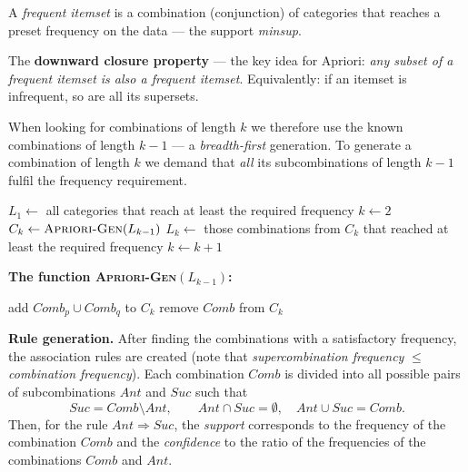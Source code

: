 \documentclass[11pt,a4paper]{article}
\theoremstyle{definition}
\begin{document}
\begin{defbox}
A \emph{frequent itemset} is a combination (conjunction) of categories that reaches a preset
frequency on the data --- the support \emph{minsup}.

The \textbf{downward closure property} --- the key idea for Apriori: \emph{any subset of a
frequent itemset is also a frequent itemset}. Equivalently: if an itemset is infrequent, so are
all its supersets.

When looking for combinations of length $k$ we therefore use the known combinations of length
$k-1$ --- a \emph{breadth-first} generation. To generate a combination of length $k$ we demand
that \emph{all} its subcombinations of length $k-1$ fulfil the frequency requirement.
\end{defbox}

\begin{defbox}
\begin{algorithmic}[1]
\State $L_1\gets$ all categories that reach at least the required frequency
\State $k\gets 2$
  \State $C_k\gets \textsc{Apriori-Gen}(L_{k-1})$ 
  \State $L_k\gets$ those combinations from $C_k$ that reached at least the required frequency
  \State $k\gets k+1$
\EndWhile
\end{algorithmic}

\textbf{The function \textsc{Apriori-Gen}$(L_{k-1})$:}
\begin{algorithmic}[1]
     \State add $\mathit{Comb}_p\cup \mathit{Comb}_q$ to $C_k$ 
  \EndIf
\EndFor
{} 
     \State remove $\mathit{Comb}$ from $C_k$
  \EndIf
\EndFor
\end{algorithmic}
\end{defbox}

\textbf{Rule generation.} After finding the combinations with a satisfactory frequency, the
association rules are created (note that \emph{supercombination frequency} $\le$
\emph{combination frequency}). Each combination $\mathit{Comb}$ is divided into all possible
pairs of subcombinations $\mathit{Ant}$ and $\mathit{Suc}$ such that
\[ \mathit{Suc}=\mathit{Comb}\setminus \mathit{Ant},\qquad
   \mathit{Ant}\cap \mathit{Suc}=\emptyset,\quad \mathit{Ant}\cup \mathit{Suc}=\mathit{Comb}. \]
Then, for the rule $\mathit{Ant}\Rightarrow \mathit{Suc}$, the \emph{support} corresponds to the
frequency of the combination $\mathit{Comb}$ and the \emph{confidence} to the ratio of the
frequencies of the combinations $\mathit{Comb}$ and $\mathit{Ant}$.
\end{document}
